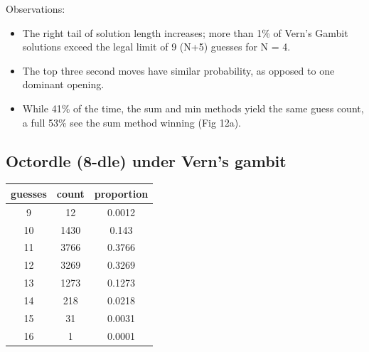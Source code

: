 \documentclass[11pt, oneside]{article} 	%
\begin{document}
Observations:
\begin{itemize}
\item The right tail of solution length increases; more than 1\% of Vern's Gambit solutions exceed the legal limit of 9 (N+5) guesses for N = 4.
\item The top three second moves have similar probability, as opposed to one dominant opening.
\item While 41\% of the time, the sum and min methods yield the same guess count, a full 53\% see the sum method winning (Fig 12a).  
\end{itemize}

\subsection{Octordle (8-dle) under Vern's gambit}

\begin{center}
\begin{tabular}{ |c|c|c| }
 \hline
guesses & count & proportion \\
 \hline
9 & 12 & 0.0012 \\
10 & 1430 & 0.143 \\
11 & 3766 & 0.3766 \\
12 & 3269 & 0.3269 \\
13 & 1273 & 0.1273 \\
14 & 218 & 0.0218 \\
15 & 31 & 0.0031 \\
16 & 1 & 0.0001 \\
 \hline
\end{tabular}
\end{center}
\end{document}
